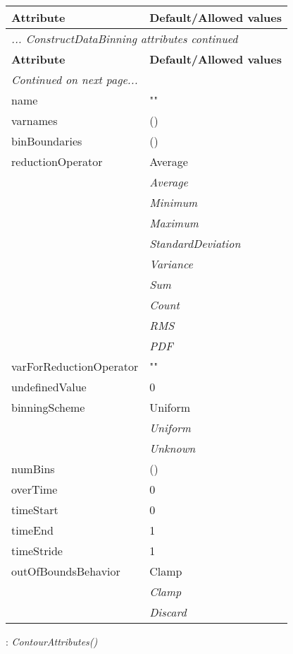 \documentclass[10pt,a4paper]{report}
\begin{document}
\begin{longtable}{ll}
{\bf Attribute} & {\bf Default/Allowed values} \\
\hline \hline
\endfirsthead
\multicolumn{2}{l}{{\it ... ConstructDataBinning attributes continued}} \\
{\bf Attribute} & {\bf Default/Allowed values} \\
\hline \hline
\endhead
\hline
\multicolumn{2}{l}{{\it Continued on next page...}} \\
\endfoot
\hline
\endlastfoot

name  &  "" \\
varnames  &  () \\
binBoundaries  &  () \\
reductionOperator  &  Average   \\
 & {\it  Average} \\
 & {\it  Minimum} \\
 & {\it  Maximum} \\
 & {\it  StandardDeviation} \\
 & {\it  Variance} \\
 & {\it  Sum} \\
 & {\it  Count} \\
 & {\it  RMS} \\
 & {\it  PDF} \\
varForReductionOperator  &  "" \\
undefinedValue  &  0 \\
binningScheme  &  Uniform   \\
 & {\it  Uniform} \\
 & {\it  Unknown} \\
numBins  &  () \\
overTime  &  0 \\
timeStart  &  0 \\
timeEnd  &  1 \\
timeStride  &  1 \\
outOfBoundsBehavior  &  Clamp   \\
 & {\it  Clamp} \\
 & {\it  Discard} \\
\end{longtable}

\newpage

{}
: {\it ContourAttributes() }\\[-3mm]
\end{document}
